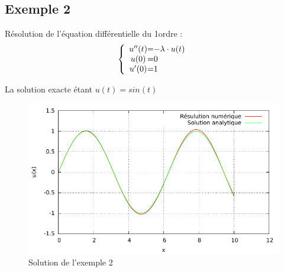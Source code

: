 \documentclass[a4paper,11pt]{article}
\begin{document}
\subsection{Exemple 2}
Résolution de l'équation différentielle du 1\ier ordre :
\begin{equation*}
 \left \{
  \begin{array}{c @{=} l}
    u''(t) & -\lambda \cdot u(t) 
\\
   u(0) & 0
\\
  u'(0)&1
  \end{array}
\right.
\end{equation*} 

La solution exacte étant $u(t)=sin(t)$

  \begin{figure}[H]
	 \begin{center}
	\includegraphics[scale=1]{exemple2}
	\caption{Solution de l'exemple 2}
	\end{center}
      \end{figure}

\newpage
\end{document}
